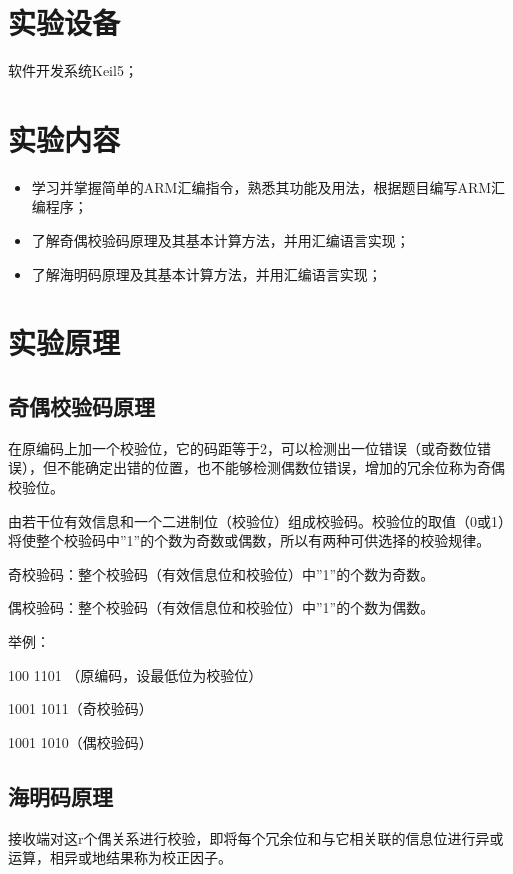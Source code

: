 \documentclass[a4paper,10pt,UTF8]{paper}
\numberwithin{equation}{section}
\numberwithin{figure}{section}
\begin{document}
\section{实验设备}

软件开发系统Keil5；

\section{实验内容}

\begin{itemize}
  \item 学习并掌握简单的ARM汇编指令，熟悉其功能及用法，根据题目编写ARM汇编程序；
  \item 了解奇偶校验码原理及其基本计算方法，并用汇编语言实现；
  \item 了解海明码原理及其基本计算方法，并用汇编语言实现；
\end{itemize}

\section{实验原理}

\subsection{奇偶校验码原理}

在原编码上加一个校验位，它的码距等于2，可以检测出一位错误（或奇数位错误），但不能确定出错的位置，也不能够检测偶数位错误，增加的冗余位称为奇偶校验位。

由若干位有效信息和一个二进制位（校验位）组成校验码。校验位的取值（0或1）将使整个校验码中”1”的个数为奇数或偶数，所以有两种可供选择的校验规律。

奇校验码：整个校验码（有效信息位和校验位）中''1''的个数为奇数。

偶校验码：整个校验码（有效信息位和校验位）中''1''的个数为偶数。

举例：

100 1101 （原编码，设最低位为校验位）

1001 1011（奇校验码）

1001 1010（偶校验码）

\subsection{海明码原理}

接收端对这r个偶关系进行校验，即将每个冗余位和与它相关联的信息位进行异或运算，相异或地结果称为校正因子。
\end{document}

